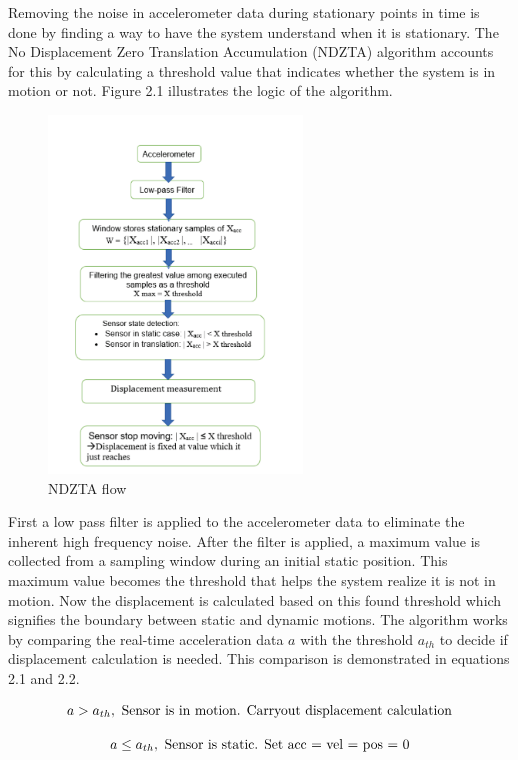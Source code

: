 Removing the noise in accelerometer data during stationary points in time is 
done by finding a way to have the system understand when it is stationary. The 
No Displacement Zero Translation Accumulation (NDZTA) algorithm accounts for 
this by calculating a threshold value that indicates whether the system is in 
motion or not. Figure 2.1 illustrates the logic of the algorithm.

\begin{figure}[h]
  \centerline{\includegraphics[height=95mm]{temp_NDZTA.PNG}}
  \caption[NDZTA Flow]{
    NDZTA flow
    }
  \label{fig:NDZTA}
\end{figure}

First a low pass filter is applied to the accelerometer data to eliminate
the inherent high frequency noise. After the filter is applied, a maximum
value is collected from a sampling window during an initial static position. 
This maximum value becomes the threshold that helps the system realize it 
is not in motion. Now the displacement is calculated based on this found 
threshold which signifies the boundary between static and dynamic motions. 
The algorithm works by comparing the real-time acceleration data $a$ with 
the threshold $a_{th}$ to decide if displacement calculation is needed. This 
comparison is demonstrated in equations 2.1 and 2.2.

\begin{equation}
	a > a_{th}, \textnormal{ Sensor is in motion. Carryout displacement calculation \\}
\end{equation}

\begin{equation}
  a \le a_{th}, \textnormal{ Sensor is static. Set acc = vel = pos = 0 \\}
\end{equation}


